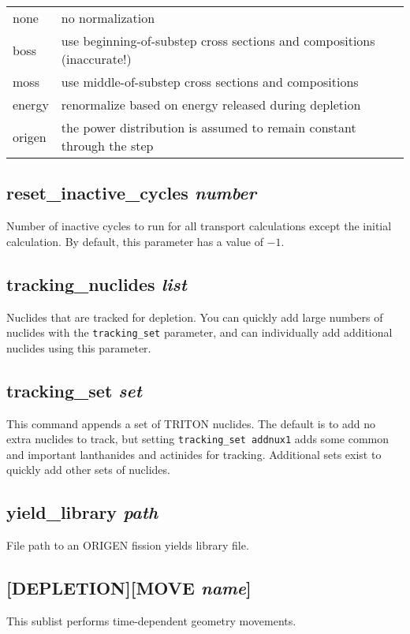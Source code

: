 \documentclass[10pt]{article}
\begin{document}
\begin{tabular}{l l}
none & no normalization\\
boss & use beginning-of-substep cross sections and compositions (inaccurate!)\\
moss & use middle-of-substep cross sections and compositions\\
energy & renormalize based on energy released during depletion\\
origen & the power distribution is assumed to remain constant through the step\\
\end{tabular}

\subsection{reset\_inactive\_cycles \textit{number}}
Number of inactive cycles to run for all transport calculations except the initial calculation. By default, this parameter has a value of \(-1\).

\subsection{tracking\_nuclides \textit{list}}
Nuclides that are tracked for depletion. You can quickly add large numbers of nuclides with the \texttt{tracking\_set} parameter, and can individually add additional nuclides using this parameter. 

\subsection{tracking\_set \textit{set}}
This command appends a set of TRITON nuclides. The default is to add no extra nuclides to track, but setting \texttt{tracking\_set addnux1} adds some common and important lanthanides and actinides for tracking. Additional sets exist to quickly add other sets of nuclides. 

\subsection{yield\_library \textit{path}}
File path to an ORIGEN fission yields library file.

\subsection{[DEPLETION][MOVE \textit{name}]}
This sublist performs time-dependent geometry movements.
\end{document}

